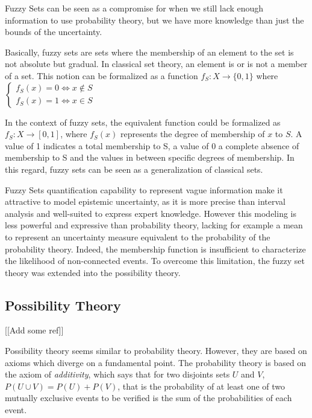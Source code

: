 Fuzzy Sets can be seen as a compromise for when we still lack enough information to use probability theory, but we have more knowledge than just the bounds of the uncertainty.

Basically, fuzzy sets are sets where the membership of an element to the set is not absolute but gradual.
In classical set theory, an element is or is not a member of a set. This notion can be formalized as a function $f_S: X \rightarrow \{0,1\}$ where 
$\left\{
 		 \begin{array}{rcr}
			f_S(x) = 0 \Leftrightarrow x \not\in S\\
			f_S(x) = 1 \Leftrightarrow x \in S
		\end{array}
	\right. $

In the context of fuzzy sets, the equivalent function could be formalized as $f_S: X \rightarrow [0, 1]$, where $f_S(x)$ represents the degree of membership of $x$ to $S$. A value of 1 indicates a total membership to S, a value of 0 a complete absence of membership to S and the values in between specific degrees of membership.
In this regard, fuzzy sets can be seen as a generalization of classical sets.

Fuzzy Sets quantification capability to represent vague information make it attractive to model epistemic uncertainty, as it is more precise than interval analysis and well-suited to express expert knowledge. However this modeling is less powerful and expressive than probability theory, lacking for example a mean to represent an uncertainty measure equivalent to the probability of the probability theory. Indeed, the membership function is insufficient to characterize the likelihood of non-connected events.
To overcome this limitation, the fuzzy set theory was extended into the possibility theory.

\subsection{Possibility Theory}

[[Add some ref]]

Possibility theory seems similar to probability theory. However, they are based on axioms which diverge on a fundamental point.
The probability theory is based on the axiom of \emph{additivity}, which says that for two disjoints sets $U$ and $V$, $P(U \cup V) = P(U)+ P(V)$, that is the probability of at least one of two mutually exclusive events to be verified is the sum of the probabilities of each event.

